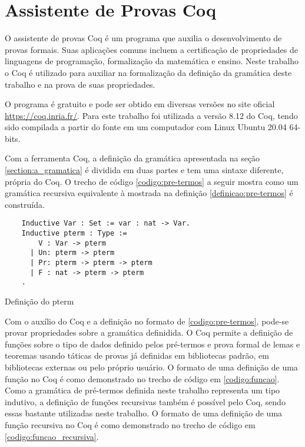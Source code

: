 \documentclass{article}
\newenvironment{codigo}{\captionsetup{type=listing}}{}
\begin{document}

\section{Assistente de Provas Coq} %
\label{section:assistente_coq}

O assistente de provas Coq é um programa que auxilia o desenvolvimento de provas formais. Suas
aplicações comuns incluem a certificação de propriedades de linguagens de programação, %
formalização da matemática e ensino. Neste trabalho o Coq é utilizado para auxiliar na formalização da
definição da gramática deste trabalho e na prova de suas propriedades.

O programa é gratuito e pode ser obtido em diversas versões no site oficial
\url{https://coq.inria.fr/}. Para este trabalho foi utilizada a versão 8.12 do Coq, tendo sido
compilada a partir do fonte em um computador com Linux Ubuntu 20.04 64-bits.

Com a ferramenta Coq, a definição da gramática apresentada na seção \ref{section:a_gramatica} é
dividida em duas partes e tem uma sintaxe diferente, própria do Coq. O trecho de código
\ref{codigo:pre-termos} a seguir mostra como um gramática recursiva equivalente à mostrada na
definição \ref{definicao:pre-termos} é construída.

\begin{codigo}
\begin{verbatim}
	Inductive Var : Set := var : nat -> Var.
	Inductive pterm : Type :=
	    V : Var -> pterm
	  | Un: pterm -> pterm
	  | Pr: pterm -> pterm -> pterm
	  | F : nat -> pterm -> pterm
	.
\end{verbatim}
\caption{Definição do pterm}
\label{codigo:pre-termos}
\end{codigo}

Com o auxílio do Coq e a definição no formato de \ref{codigo:pre-termos}, pode-se provar propriedades
sobre a gramática definidida. O Coq permite a definição de funções sobre o tipo de dados definido pelos
pré-termos e prova formal de lemas e teoremas usando táticas de provas já definidas em bibliotecas
padrão, em bibliotecas externas ou pelo próprio usuário. O formato de uma definição de uma função no
Coq é como demonstrado no trecho de código em \ref{codigo:funcao}. Como a gramática de pré-termos
definida neste trabalho representa um tipo indutivo, a definição de funções recursivas também é
possível pelo Coq, sendo essas bastante utilizadas neste trabalho. O formato de uma definição de uma
função recursiva no Coq é como demonstrado no trecho de código em \ref{codigo:funcao_recursiva}. 
\end{document}
